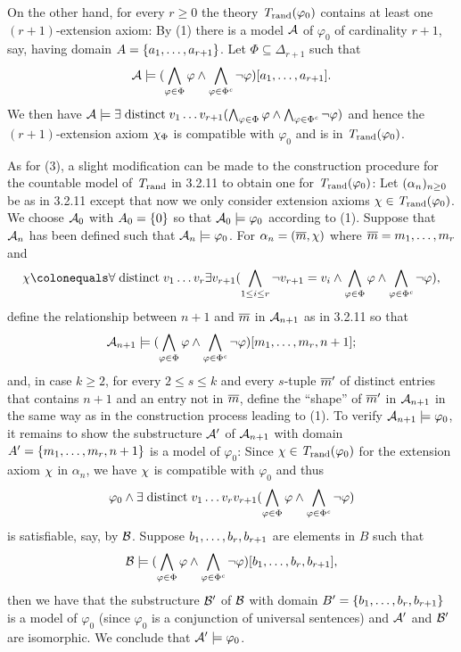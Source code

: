 \begin{enumerate}[1.]
On the other hand, for every $r \geq 0$ the theory $\mathit{T}_{\mathrm{rand}}(\varphi_0)$ contains at least one $(r + 1)$-extension axiom: By (1) there is a model $\mathcal{A}$ of $\varphi_0$ of cardinality $r + 1$, say, having domain $A = {\{a_1, \ldots, a_{r + 1}\}}$. Let $\Phi \subseteq \Delta_{r + 1}$ such that
\[
\mathcal{A} \models (\bigwedge_{\varphi \in \Phi} \varphi \land \bigwedge_{\varphi \in \Phi^\mathit{c}} \neg\varphi) [a_1, \ldots, a_{r + 1}].
\]
We then have $\mathcal{A} \models \exists \mathrel{\mathrm{distinct}} v_1 \ldots v_{r + 1} (\bigwedge_{\varphi \in \Phi} \varphi \land \bigwedge_{\varphi \in \Phi^\mathit{c}} \neg\varphi)$ and hence the $(r + 1)$-extension axiom $\extaxm[\Phi]$ is compatible with $\varphi_0$ and is in $\mathit{T}_{\mathrm{rand}}(\varphi_0)$.

As for (3), a slight modification can be made to the construction procedure for the countable model of $\mathit{T}_{\mathrm{rand}}$ in 3.2.11 to obtain one for $\mathit{T}_{\mathrm{rand}}(\varphi_0)$: Let $(\alpha_n)_{n \geq 0}$ be as in 3.2.11 except that now we only consider extension axioms $\extaxm \in \randstrtheory(\varphi_0)$. We choose $\mathcal{A}_0$ with $A_0 = {\{0\}}$ so that $\mathcal{A}_0 \models \varphi_0$ according to (1). Suppose that $\mathcal{A}_n$ has been defined such that $\mathcal{A}_n \models \varphi_0$. For $\alpha_n = (\vect{m}, \extaxm)$ where $\overline{m} = m_1, \ldots, m_r$ and
\[
\extaxm \defas \forall \distinct v_1 \etc v_r \exists v_{r + 1} (\bland_{1 \leq i \leq r} \neg v_{r + 1} = v_i \land \bland_{\varphi \in \Phi} \varphi \land \bland_{\varphi \in \cmpl{\Phi}} \neg\varphi),
\]
define the relationship between $n + 1$ and $\overline{m}$ in $\mathcal{A}_{n + 1}$ as in 3.2.11 so that
\[
\mathcal{A}_{n + 1} \models (\bigwedge_{\varphi \in \Phi} \varphi \land \bigwedge_{\varphi \in \Phi^\mathit{c}} \neg\varphi) [m_1, \ldots, m_r, n + 1];
\]
and, in case $k \geq 2$, for every $2 \leq s \leq k$ and every $s$-tuple $\overline{m}'$ of distinct entries that contains $n + 1$ and an entry not in $\overline{m}$, define the ``shape'' of $\overline{m}'$ in $\mathcal{A}_{n + 1}$ in the same way as in the construction process leading to (1). To verify $\mathcal{A}_{n + 1} \models \varphi_0$, it remains to show the substructure $\mathcal{A}'$ of $\mathcal{A}_{n + 1}$ with domain $A' = {\{m_1, \ldots, m_r, n + 1\}}$ is a model of $\varphi_0$: Since $\extaxm \in \randstrtheory(\varphi_0)$ for the extension axiom $\extaxm$ in $\alpha_n$, we have $\extaxm$ is compatible with $\varphi_0$ and thus
\[
\varphi_0 \land \exists \mathrel{\mathrm{distinct}} v_1 \ldots v_r v_{r + 1} (\bigwedge_{\varphi \in \Phi} \varphi \land \bigwedge_{\varphi \in \Phi^\mathit{c}} \neg\varphi)
\]
is satisfiable, say, by $\mathcal{B}$. Suppose $b_1, \ldots, b_r, b_{r + 1}$ are elements in $B$ such that
\[
\mathcal{B} \models (\bigwedge_{\varphi \in \Phi} \varphi \land \bigwedge_{\varphi \in \Phi^\mathit{c}} \neg\varphi) [b_1, \ldots, b_r, b_{r + 1}],
\]
then we have that the substructure $\mathcal{B}'$ of $\mathcal{B}$ with domain $B' = {\{b_1, \ldots, b_r, b_{r + 1}\}}$ is a model of $\varphi_0$ (since $\varphi_0$ is a conjunction of universal sentences) and $\mathcal{A}'$ and $\mathcal{B}'$ are isomorphic. We conclude that $\mathcal{A}' \models \varphi_0$.
%
\end{enumerate}


